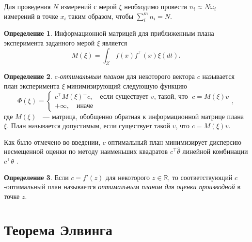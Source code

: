\documentclass[specialist,
               substylefile = spbu.rtx,
               subf,href,colorlinks=true, 12pt]{disser}
\theoremstyle{definition}
\newtheorem{definition}{Определение}
\begin{document}
  Для проведения $N$ измерений с мерой $\xi$ необходимо провести $n_i \approx N \omega_i$ измерений в точке $x_i$ таким образом, чтобы $\sum^m_i n_i = N$.

  \begin{definition}
  Информационной матрицей для приближенным плана эксперимента заданного мерой $\xi$ является 
  \begin{equation*}
    M(\xi) = \int_{\mathcal{X}} f(x) f^\top(x) \xi (dt).
  \end{equation*}
  \end{definition}
  
  \begin{definition}
  \label{def:coptim}
  \textit{$c$-оптимальным планом} для некоторого вектора $c$ называется план эксперимента $\xi$ минимизирующий следующую функцию
  \begin{equation*}
    \Phi(\xi) = \begin{cases}
      c^\top M(\xi)^{-} c, \quad \text{если существует } v \text{, такой, что } \; c = M(\xi) v\\
      +\infty, \quad  \text{иначе}
    \end{cases},
  \end{equation*}
  где $M(\xi)^{-}$ --- матрица, обобщенно обратная к информационной матрице плана $\xi$.
  План называется допустимым, если существует такой $v$, что $c = M(\xi) v$.
  \end{definition}
  
  Как было отмечено во введении, $c$-оптимальный план минимизирует дисперсию несмещенной оценки по методу наименьших квадратов $c^\top \hat{\theta}$ линейной комбинации $c^\top \theta$ \cite{dette1993_2}.
 
  \begin{definition}
  Если $c = f'(z)$ для некоторого $z \in \mathbb{R}$, то соответствующий $c$-оптимальный план называется \textit{оптимальным планом для оценки производной} в точке $z$.
  \end{definition}
  
  \section{Теорема Элвинга}
  
\end{document}
